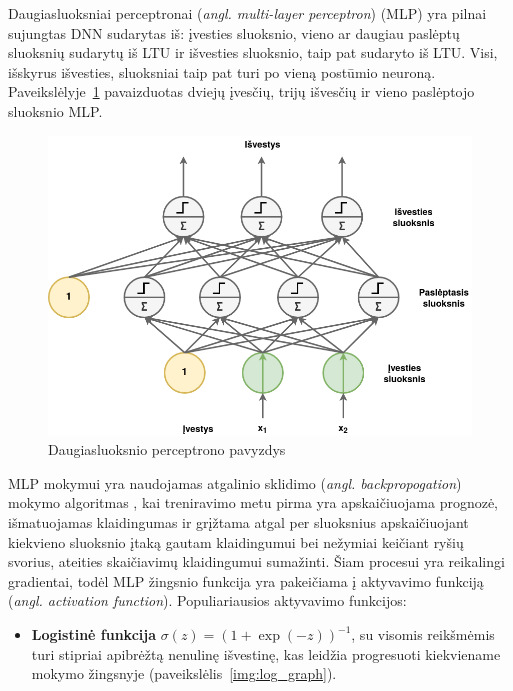 \documentclass{VUMIFPSbakalaurinis}
\begin{document}
{
	Daugiasluoksniai perceptronai (\textit{angl. multi-layer perceptron}) (MLP) yra pilnai sujungtas DNN sudarytas iš: įvesties sluoksnio, vieno ar daugiau paslėptų sluoksnių sudarytų iš LTU ir išvesties sluoksnio, taip pat sudaryto iš LTU. Visi, išskyrus išvesties, sluoksniai taip pat turi po vieną postūmio neuroną. Paveikslėlyje~\ref{img:mlp} pavaizduotas dviejų įvesčių, trijų išvesčių ir vieno paslėptojo sluoksnio MLP.
	
	\begin{figure}[H]
		\centering
		\includegraphics[scale=0.33]{img/mlp}
		\caption{Daugiasluoksnio perceptrono pavyzdys}
		\label{img:mlp}
	\end{figure} 
	
	MLP mokymui yra naudojamas atgalinio sklidimo (\textit{angl. backpropogation}) mokymo algoritmas \cite{rumelhart1985learning}, kai treniravimo metu pirma yra apskaičiuojama prognozė, išmatuojamas klaidingumas ir grįžtama atgal per sluoksnius apskaičiuojant kiekvieno sluoksnio įtaką gautam klaidingumui bei nežymiai keičiant ryšių svorius, ateities skaičiavimų klaidingumui sumažinti. Šiam procesui yra reikalingi gradientai, todėl MLP žingsnio funkcija yra pakeičiama į aktyvavimo funkciją (\textit{angl. activation function}). Populiariausios aktyvavimo funkcijos:
	
	\begin{itemize}
		\item \textbf{Logistinė funkcija} \(\sigma(z) = (1 + \exp(-z))^{-1}\), su visomis reikšmėmis turi stipriai apibrėžtą nenulinę išvestinę, kas leidžia progresuoti kiekviename mokymo žingsnyje (paveikslėlis~\ref{img:log_graph}).
		

\end{itemize}}
\end{document}
